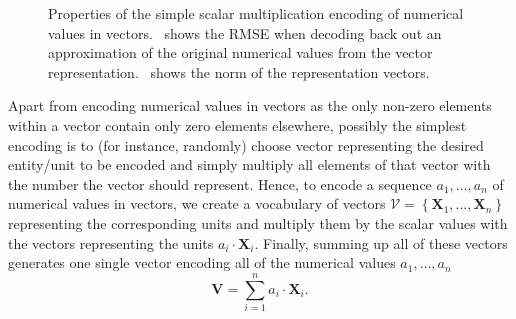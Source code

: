 \begin{figure}[t]
    \centering
    \caption{Properties of the simple scalar multiplication encoding of numerical values in vectors.~\protect{} shows the \ac{RMSE} when decoding back out an approximation of the original numerical values from the vector representation.~\protect{} shows the norm of the representation vectors.}
    \label{fig:scalar_multiplication_encoding}
\end{figure}
Apart from encoding numerical values in vectors as the only non-zero elements within a vector contain only zero elements elsewhere, possibly the simplest encoding is to (for instance, randomly) choose vector representing the desired entity/unit to be encoded and simply multiply all elements of that vector with the number the vector should represent.
Hence, to encode a sequence $a_{1}, \ldots, a_{n}$ of numerical values in vectors, we create a vocabulary of vectors $\mathcal{V}=\left\{ \mathbf{X}_{1}, \ldots, \mathbf{X}_{n} \right\}$ representing the corresponding units and multiply them by the scalar values with the vectors representing the units $a_{i}\cdot \mathbf{X}_{i}$.
Finally, summing up all of these vectors generates one single vector encoding all of the numerical values $a_{1}, \ldots, a_{n}$ 
\begin{equation}
\label{eq:scalar_mult_encoding}
\mathbf{V} = \sum\limits_{i=1}^{n} a_{i}\cdot \mathbf{X}_{i}. 
\end{equation}

